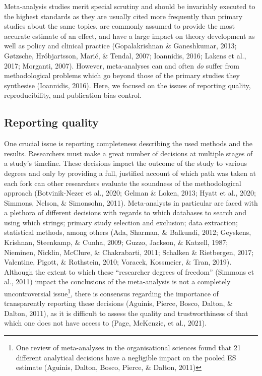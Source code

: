 \documentclass[
  man,floatsintext]{apa6}
\begin{document}
Meta-analysis studies merit special scrutiny and should be invariably executed to the highest standards as they are usually cited more frequently than primary studies about the same topics, are commonly assumed to provide the most accurate estimate of an effect, and have a large impact on theory development as well as policy and clinical practice (Gopalakrishnan \& Ganeshkumar, 2013; Gøtzsche, Hróbjartsson, Marić, \& Tendal, 2007; Ioannidis, 2016; Lakens et al., 2017; Morganti, 2007). However, meta-analyses can and often \emph{do} suffer from methodological problems which go beyond those of the primary studies they synthesise (Ioannidis, 2016). Here, we focused on the issues of reporting quality, reproducibility, and publication bias control.
\vspace{-5mm}

\hypertarget{reporting-quality}{%
\subsection{Reporting quality}\label{reporting-quality}}

One crucial issue is reporting completeness describing the used methods and the results. Researchers must make a great number of decisions at multiple stages of a study's timeline. These decisions impact the outcome of the study to various degrees and only by providing a full, justified account of which path was taken at each fork can other researchers evaluate the soundness of the methodological approach (Botvinik-Nezer et al., 2020; Gelman \& Loken, 2013; Hyatt et al., 2020; Simmons, Nelson, \& Simonsohn, 2011). Meta-analysts in particular are faced with a plethora of different decisions with regards to which databases to search and using which strings; primary study selection and exclusion; data extraction; statistical methods, among others (Ada, Sharman, \& Balkundi, 2012; Geyskens, Krishnan, Steenkamp, \& Cunha, 2009; Guzzo, Jackson, \& Katzell, 1987; Nieminen, Nicklin, McClure, \& Chakrabarti, 2011; Schalken \& Rietbergen, 2017; Valentine, Pigott, \& Rothstein, 2010; Voracek, Kossmeier, \& Tran, 2019). Although the extent to which these ``researcher degrees of freedom'' (Simmons et al., 2011) impact the conclusions of the meta-analysis is not a completely uncontroversial issue\footnote{One review of meta-analyses in the organisational sciences found that 21 different analytical decisions have a negligible impact on the pooled ES estimate (Aguinis, Dalton, Bosco, Pierce, \& Dalton, 2011)}, there is consensus regarding the importance of transparently reporting these decisions (Aguinis, Pierce, Bosco, Dalton, \& Dalton, 2011), as it is difficult to assess the quality and trustworthiness of that which one does not have access to (Page, McKenzie, et al., 2021).
\end{document}
